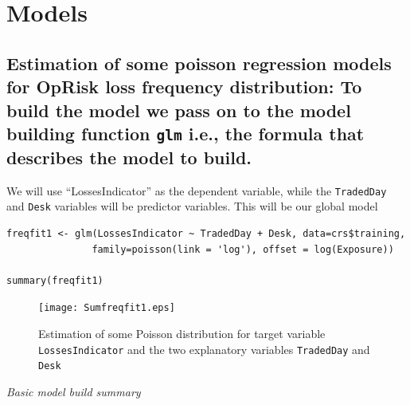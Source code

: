 \documentclass{DissertateUSU}
\begin{document}
\normalsize

\doublespacing

\section{Models}
\label{sec:Models}

\singlespace

\subsection{Estimation of some poisson regression models for OpRisk loss frequency distribution: To build the model we pass on to the model building function \texttt{glm} i.e., the formula that describes the model to build.}
\label{ssec:Estimation of some poisson regression models for OpRisk loss frequency distribution}

We will use ``LossesIndicator'' as the dependent variable, while the
\texttt{TradedDay} and \texttt{Desk} variables will be predictor
variables. This will be our global model

\small

\begin{verbatim}
freqfit1 <- glm(LossesIndicator ~ TradedDay + Desk, data=crs$training,
               family=poisson(link = 'log'), offset = log(Exposure))

summary(freqfit1)
\end{verbatim}

\normalsize

\begin{figure}
\centering
\texttt{[image: Sumfreqfit1.eps]}
\caption[Poisson GLM Summary statistics]{Estimation of some Poisson distribution for target variable \texttt{LossesIndicator} and the two explanatory variables \texttt{TradedDay} and \texttt{Desk}}
\label{Two variable poisson estimation}
\end{figure}

\emph{Basic model build summary}
\end{document}
